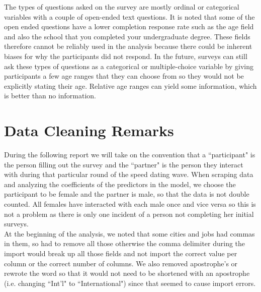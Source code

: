 \documentclass{article}
\begin{document}
The types of questions asked on the survey are mostly ordinal or categorical variables with a couple of open-ended text questions.  It is noted that some of the open ended questions have a lower completion response rate such as the age field and also the school that you completed your undergraduate degree.  These fields therefore cannot be reliably used in the analysis because there could be inherent biases for why the participants did not respond. In the future, surveys can still ask these types of questions as a categorical or multiple-choice variable by giving participants a few age ranges that they can choose from so they would not be explicitly stating their age.  Relative age ranges can yield some information, which is better than no information.\\


\section{Data Cleaning Remarks}
During the following report we will take on the convention that a ``participant" is the person filling out the survey and the ``partner" is the person they interact with during that particular round of the speed dating wave.  When scraping data and analyzing the coefficients of the predictors in the model, we choose the participant to be female and the partner is male, so that the data is not double counted.  All females have interacted with each male once and vice versa so this is not a problem as there is only one incident of a person not completing her initial surveys.\\

At the beginning of the analysis, we noted that some cities and jobs had commas in them, so had to remove all those otherwise the comma delimiter during the import would break up all those fields and not import the correct value per column or the correct number of columns.  We also removed apostrophe's  or rewrote the word so that it would not need to be shortened with an apostrophe (i.e. changing ``Int'l" to ``International") since that seemed to cause import errors.\\

\end{document}
